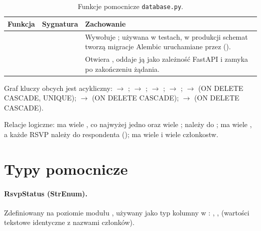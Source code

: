 \begin{table}[H]
\centering\small
\renewcommand{\arraystretch}{1.2}
\begin{tabularx}{\textwidth}{@{}llY@{}}
\toprule
\textbf{Funkcja} & \textbf{Sygnatura} & \textbf{Zachowanie} \\
\midrule
{} &  & Wywołuje ; używana w testach, w produkcji schemat tworzą migracje Alembic uruchamiane przez  (). \\
 &  & Otwiera , oddaje ją jako zależność FastAPI i zamyka po zakończeniu żądania. \\
\bottomrule
\end{tabularx}
\caption{Funkcje pomocnicze \texttt{database.py}.}
\end{table}

Graf kluczy obcych jest acykliczny:  $\rightarrow$ ;
 $\rightarrow$ ; 
$\rightarrow$ ;  $\rightarrow$ ;
 $\rightarrow$  (ON DELETE CASCADE, UNIQUE);
 $\rightarrow$  (ON DELETE CASCADE);
 $\rightarrow$  (ON DELETE CASCADE).


Relacje logiczne:  ma wiele , co najwyżej jedno 
oraz wiele ;  należy do ;  ma
wiele , a każde RSVP należy do respondenta (); 
ma wiele  i wiele członkostw.

\section{Typy pomocnicze}
\label{sec:dane-enum}

\paragraph{RsvpStatus (StrEnum).} Zdefiniowany na poziomie modułu ,
używany jako typ kolumny  w : ,
,  (wartości tekstowe identyczne z nazwami członków).

